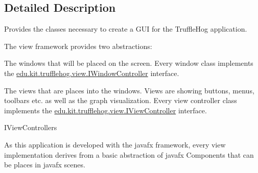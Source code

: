 \subsection{Detailed Description}
Provides the classes necessary to create a G\+U\+I for the Truffle\+Hog application. 

The view framework provides two abstractions\+: 
\begin{DoxyItemize}
\item The windows that will be placed on the screen. Every window class implements the \hyperlink{interfaceedu_1_1kit_1_1trufflehog_1_1view_1_1_i_window_controller}{edu.\+kit.\+trufflehog.\+view.\+I\+Window\+Controller} interface.  
\item The views that are places into the windows. Views are showing buttons, menus, toolbars etc. as well as the graph visualization. Every view controller class implements the \hyperlink{interfaceedu_1_1kit_1_1trufflehog_1_1view_1_1_i_view_controller}{edu.\+kit.\+trufflehog.\+view.\+I\+View\+Controller} interface.
\begin{DoxyCode}
IViewControllers 
\end{DoxyCode}
  
\end{DoxyItemize}

As this application is developed with the javafx framework, every view implementation derives from a basic abstraction of javafx Components that can be places in javafx scenes. 